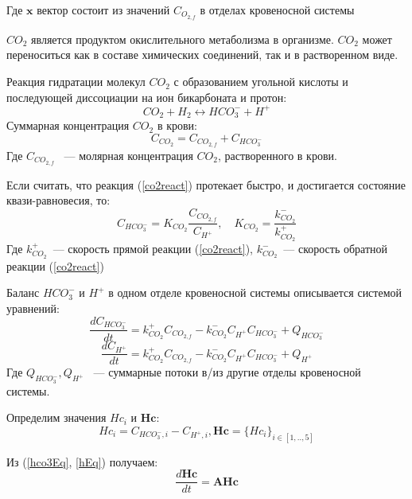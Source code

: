 Где \(\mathbf{x}\) вектор состоит из значений \( C_{O_{2,f}}\) в отделах кровеносной системы

\( CO_{2}\) является продуктом окислительного метаболизма в организме. \( CO_{2}\) может переноситься как в составе химических соединений, так и в растворенном виде.

Реакция гидратации молекул \( CO_{2}\) с образованием угольной кислоты и последующей диссоциации на ион бикарбоната и протон:
\begin{equation}
CO_{2}+H_{2} \longleftrightarrow HCO_{3}^{-}+H^{+}
\label{co2react}
\end{equation}
Суммарная концентрация \( CO_{2}\) в крови:
\begin{equation}
C_{CO_{2}}=C_{CO_{2,f}}+C_{HCO_{3}^{-}}
\label{co2freehco3}
\end{equation}
Где \( C_{CO_{2,f}}\) ~--- молярная концентрация \( CO_{2}\), растворенного в крови.

Если считать, что реакция (\ref{co2react}) протекает быстро, и достигается состояние квази-равновесия, то:
\begin{equation}
C_{HCO_{3}^{-}}=K_{CO_{2}}\frac{C_{CO_{2,f}}}{C_{H^{+}}}, \quad K_{CO_{2}}=\frac{k_{CO_{2}}^{-}}{k_{CO_{2}}^{+}}
\label{co2q}
\end{equation}
Где \( k_{CO_{2}}^{+}\)~--- скорость прямой реакции (\ref{co2react}), \( k_{CO_{2}}^{-}\)~--- скорость обратной реакции (\ref{co2react})

Баланс \( HCO_{3}^{-}\) и \( H^{+}\)  в одном отделе кровеносной системы описывается системой уравнений:
\begin{equation}
\frac{dC_{HCO_{3}^{-}}}{dt}=k_{CO_{2}}^{+} C_{CO_{2,f}}-k_{CO_{2}}^{-}C_{H^{+}}C_{HCO_{3}^{-}}+Q_{HCO_{3}^{-}}
\label{hco3Eq}
\end{equation}
\begin{equation}
\frac{dC_{H^{+}}}{dt}=k_{CO_{2}}^{+} C_{CO_{2,f}}-k_{CO_{2}}^{-}C_{H^{+}}C_{HCO_{3}^{-}}+Q_{H^{+}}
\label{hEq}
\end{equation}
Где \( Q_{HCO_{3}^{-}}, Q_{H^{+}}\) ~--- суммарные потоки в/из другие отделы кровеносной системы.

Определим значения $Hc_i$ и $\mathbf{Hc}$: 
\begin{equation}
Hc_{i}=C_{HCO_{3}^{-},i}-C_{H^{+},i}, \mathbf{Hc} = \{ Hc_i \}_{i \in [1,..,5]}
\end{equation}

Из (\ref{hco3Eq}, \ref{hEq}) получаем:
\begin{equation}
\frac{d \textbf{Hc}}{dt}= \mathbf{A Hc}
\label{hhco3Flow}
\end{equation}

